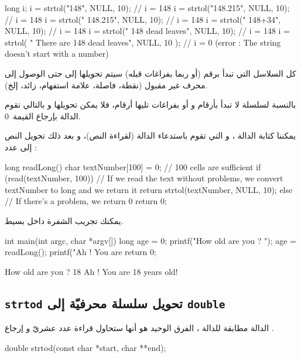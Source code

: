 \begin{Csource}
long i;
i = strtol("148", NULL, 10); // i = 148
i = strtol("148.215", NULL, 10); // i = 148
i = strtol(" 148.215", NULL, 10); // i = 148
i = strtol(" 148+34", NULL, 10); // i = 148
i = strtol(" 148 dead leaves", NULL, 10); // i = 148
i = strtol( " There are 148 dead leaves", NULL, 10 ); // i = 0 (error : The string doesn't start with a number)
\end{Csource}

كل السلاسل التي تبدأ برقم (أو ربما بفراغات قبله) سيتم تحويلها إلى
حتى الوصول إلى محرف غير مقبول (نقطة، فاصلة، علامة استفهام، زائد، إلخ).

بالنسبة لسلسلة لا تبدأ بأرقام و أو بفراغات تليها أرقام، فلا يمكن تحويلها و بالتالي تقوم الدالة بإرجاع القيمة~0.

يمكننا كتابة الدالة
،
و التي تقوم باستدعاء الدالة
(لقراءة النص)، و بعد ذلك تحويل النص إلى عدد :

\begin{Csource}
long readLong()
{
 	char textNumber[100] = {0}; // 100 cells are sufficient
 	if (read(textNumber, 100))
 	{
     		// If we read the text without problems, we convert textNumber to long and we return it
    		 return strtol(textNumber, NULL, 10);
 	}
 	else
 	{
    		 // If there's a problem, we return 0
     		return 0;
	 }
}
\end{Csource}

يمكنك تجريب الشفرة داخل
بسيط.

\begin{Csource}
int main(int argc, char *argv[])
{
 	long age = 0;
 	printf("How old are you ? ");
 	age = readLong();
 	printf("Ah ! You are %
 	return 0;
}
\end{Csource}

\begin{Console}
How old are you ? 18
Ah ! You are 18 years old!
\end{Console}

\subsection{\texttt{strtod} تحويل سلسلة محرفيّة إلى \texttt{double}}

الدالة
مطابقة للدالة
،
الفرق الوحيد هو أنها ستحاول قراءة عدد عشريّ و إرجاع
.

\begin{Csource}
double strtod(const char *start, char **end);
\end{Csource}

